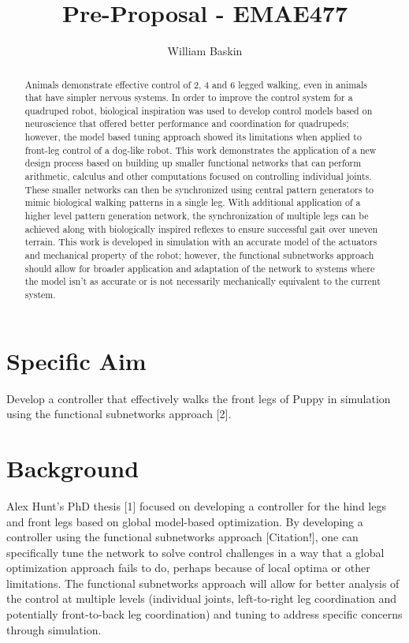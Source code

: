 \documentclass[12pt, letterpaper, oneside, notitlepage, onecolumn]{article}
\author{William Baskin}
\title{Pre-Proposal - EMAE477}
\begin{document}
\maketitle

\begin{abstract}
Animals demonstrate effective control of 2, 4 and 6 legged walking, even in animals that have simpler nervous systems.
In order to improve the control system for a quadruped robot, biological inspiration was used to develop control models based on neuroscience that offered better performance and coordination for quadrupeds; however, the model based tuning approach showed its limitations when applied to front-leg control of a dog-like robot.
This work demonstrates the application of a new design process based on building up smaller functional networks that can perform arithmetic, calculus and other computations focused on controlling individual joints.
These smaller networks can then be synchronized using central pattern generators to mimic biological walking patterns in a single leg.
With additional application of a higher level pattern generation network, the synchronization of multiple legs can be achieved along with biologically inspired reflexes to ensure successful gait over uneven terrain.
This work is developed in simulation with an accurate model of the actuators and mechanical property of the robot; however, the functional subnetworks approach should allow for broader application and adaptation of the network to systems where the model isn't as accurate or is not necessarily mechanically equivalent to the current system.
\end{abstract}

\newpage

\section*{Specific Aim}

Develop a controller that effectively walks the front legs of Puppy in simulation using the functional subnetworks approach [2].

\section{Background}

Alex Hunt's PhD thesis [1] focused on developing a controller for the hind legs and front legs based on global model-based optimization. By developing a controller using the functional subnetworks approach [Citation!], one can specifically tune the network to solve control challenges in a way that a global optimization approach fails to do, perhaps because of local optima or other limitations. The functional subnetworks approach will allow for better analysis of the control at multiple levels (individual joints, left-to-right leg coordination and potentially front-to-back leg coordination) and tuning to address specific concerns through simulation.
\end{document}
